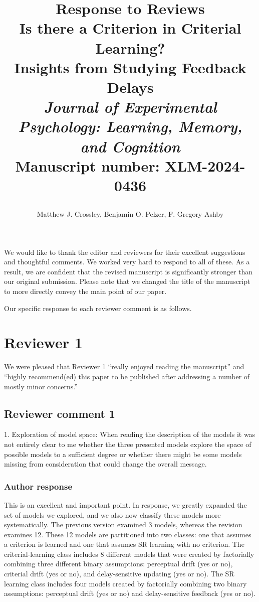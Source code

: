 \documentclass[12pt]{article}
\title{\begin{large}\textbf{Response to Reviews} \\ \vspace{.1in}
Is there a Criterion in Criterial Learning? \\ Insights from Studying Feedback Delays \\ \vspace{.1in}
\textit{Journal of Experimental Psychology: Learning, Memory, and Cognition} \\ \vspace{-.1in}
Manuscript number: XLM-2024-0436 \end{large}}
\author{
    Matthew J. Crossley, 
    Benjamin O. Pelzer,
    F. Gregory Ashby
}
\date{}
\begin{document}
\maketitle 

We would like to thank the editor and reviewers for their
excellent suggestions and thoughtful comments. We worked
very hard to respond to all of these. As a result, we are
confident that the revised manuscript is significantly
stronger than our original submission. Please note that we
changed the title of the manuscript to more directly convey
the main point of our paper.

Our specific response to each reviewer comment is as
follows. 

\section{Reviewer 1}
We were pleased that Reviewer 1 ``really enjoyed reading the
manuscript'' and ``highly recommend(ed) this paper to be
published after addressing a number of mostly minor
concerns.'' 

\subsection{Reviewer comment 1}
1. Exploration of model space: When reading the description
of the models it was not entirely clear to me whether the
three presented models explore the space of possible models
to a sufficient degree or whether there might be some models
missing from consideration that could change the overall
message. 

\subsubsection{Author response}
This is an excellent and important point. In response, we
greatly expanded the set of models we explored, and we also
now classify these models more systematically. The previous
version examined 3 models, whereas the revision examines 12.
These 12 models are partitioned into two classes: one that
assumes a criterion is learned and one that assumes SR
learning with no criterion. The criterial-learning class
includes 8 different models that were created by factorially
combining three different binary assumptions: perceptual
drift (yes or no), criterial drift (yes or no), and
delay-sensitive updating (yes or no). The SR learning class
includes four models created by factorially combining two
binary assumptions: perceptual drift (yes or no) and
delay-sensitive feedback (yes or no). 
\end{document}
